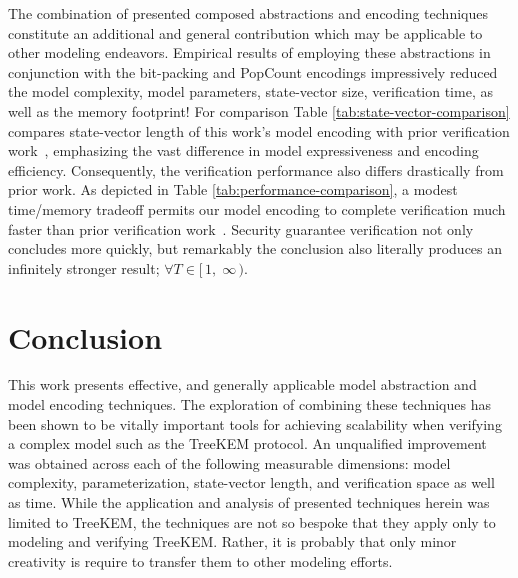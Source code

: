 \documentclass[runningheads]{llncs}
\newcommand{\NumericRangeOpenR}[2]{\ensuremath{[\,#1,\; #2\,)}\xspace}
\begin{document}
The combination of presented composed abstractions and encoding techniques constitute an additional and general contribution which may be applicable to other modeling endeavors.
Empirical results of employing these abstractions in conjunction with the bit-packing and PopCount encodings impressively reduced the model complexity, model parameters, state-vector size, verification time, as well as the memory footprint!
For comparison Table \ref{tab:state-vector-comparison} compares state-vector length of this work's model encoding with prior verification work~\cite{washburn2022formal}, emphasizing the vast difference in model expressiveness and encoding efficiency.
Consequently, the verification performance also differs drastically from prior work.
As depicted in Table \ref{tab:performance-comparison}, a modest time/memory tradeoff permits our model encoding to complete verification much faster than prior verification work~\cite{washburn2022formal}.
Security guarantee verification not only concludes more quickly, but remarkably the conclusion also literally produces an infinitely stronger result; $\forall T \in \NumericRangeOpenR{1}{\infty}$.
    
\section{Conclusion}

This work presents effective, and generally applicable model abstraction and model encoding techniques.
The exploration of combining these techniques has been shown to be vitally important tools for achieving scalability when verifying a complex model such as the TreeKEM protocol.
An unqualified improvement was obtained across each of the following measurable dimensions: model complexity,  parameterization, state-vector length, and verification space as well as time.
While the application and analysis of presented techniques herein was limited to TreeKEM, the techniques are not so bespoke that they apply only to modeling and verifying TreeKEM.
Rather, it is probably that only minor creativity is require to transfer them to other modeling efforts.
\end{document}
